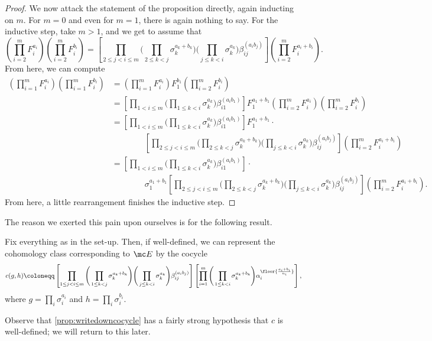 \documentclass{article}
\numberwithin{equation}{section}
\begin{document}
\begin{proof}
	We now attack the statement of the proposition directly, again inducting on $m$. For $m=0$ and even for $m=1$, there is again nothing to say. For the inductive step, take $m>1$, and we get to assume that
	\[\left(\prod_{i=2}^mF_i^{a_i}\right)\left(\prod_{i=2}^mF_i^{b_i}\right)=\left[\prod_{2\le j<i\le m}\Bigg(\prod_{2\le k<j}\sigma_k^{a_k+b_k}\Bigg)\Bigg(\prod_{j\le k<i}\sigma_k^{a_k}\Bigg)\beta_{ij}^{(a_ib_j)}\right]\left(\prod_{i=2}^mF_i^{a_i+b_i}\right).\]
	From here, we can compute
	\begin{align*}
		\left(\prod_{i=1}^mF_i^{a_i}\right)\left(\prod_{i=1}^mF_i^{b_i}\right) &= \left(\prod_{i=1}^mF_i^{a_i}\right)F_1^{b_1}\left(\prod_{i=2}^mF_i^{b_i}\right) \\
		&= \left[\prod_{1<i\le m}\Bigg(\prod_{1\le k<i}\sigma_k^{a_k}\Bigg)\beta_{i1}^{(a_ib_1)}\right]F_1^{a_1+b_1}\left(\prod_{i=2}^mF_i^{a_i}\right)\left(\prod_{i=2}^mF_i^{b_i}\right) \\
		&= \left[\prod_{1<i\le m}\Bigg(\prod_{1\le k<i}\sigma_k^{a_k}\Bigg)\beta_{i1}^{(a_ib_1)}\right]F_1^{a_1+b_1}\cdot \\
		&\qquad\qquad\left[\prod_{2\le j<i\le m}\Bigg(\prod_{2\le k<j}\sigma_k^{a_k+b_k}\Bigg)\Bigg(\prod_{j\le k<i}\sigma_k^{a_k}\Bigg)\beta_{ij}^{(a_ib_j)}\right]\left(\prod_{i=2}^mF_i^{a_i+b_i}\right) \\
		&= \left[\prod_{1<i\le m}\Bigg(\prod_{1\le k<i}\sigma_k^{a_k}\Bigg)\beta_{i1}^{(a_ib_1)}\right]\cdot \\
		&\qquad\qquad \sigma_1^{a_1+b_1}\left[\prod_{2\le j<i\le m}\Bigg(\prod_{2\le k<j}\sigma_k^{a_k+b_k}\Bigg)\Bigg(\prod_{j\le k<i}\sigma_k^{a_k}\Bigg)\beta_{ij}^{(a_ib_j)}\right]\left(\prod_{i=2}^mF_i^{a_i+b_i}\right).
	\end{align*}
	From here, a little rearrangement finishes the inductive step.
\end{proof}
The reason we exerted this pain upon ourselves is for the following result.
\begin{prop} \label{prop:writedowncocycle}
	Fix everything as in the set-up. Then, if well-defined, we can represent the cohomology class corresponding to $\mc E$ by the cocycle
	\[c(g,h)\coloneqq\left[\prod_{1\le j<i\le m}\Bigg(\prod_{1\le k<j}\sigma_k^{a_k+b_k}\Bigg)\Bigg(\prod_{j\le k<i}\sigma_k^{a_k}\Bigg)\beta_{ij}^{(a_ib_j)}\right]\left[\prod_{i=1}^m\Bigg(\prod_{1\le k<i}\sigma_k^{a_k+b_k}\Bigg)\alpha_i^{\floor{\frac{a_i+b_i}{n_i}}}\right],\]
	where $g=\prod_i\sigma_i^{a_i}$ and $h=\prod_i\sigma_i^{b_i}$.
\end{prop}
Observe that \autoref{prop:writedowncocycle} has a fairly strong hypothesis that $c$ is well-defined; we will return to this later.
\end{document}
